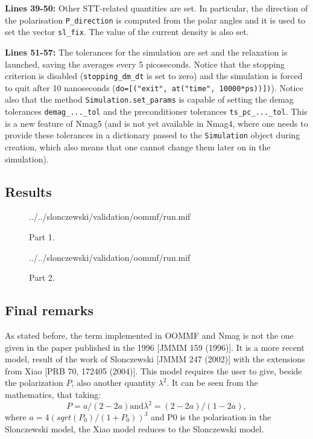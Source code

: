 \documentclass[11pt,oneside,openany]{article}
\begin{document}
\textbf{Lines 39-50:} Other STT-related quantities are set. In particular,
the direction of the polarisation \verb|P_direction| is computed from the
polar angles and it is used to set the vector \verb|sl_fix|.
The value of the current density is also set. 

\textbf{Lines 51-57:} The tolerances for the simulation are set
and the relaxation is launched, saving the averages every 5 picoseconds.
Notice that the stopping criterion is disabled (\verb|stopping_dm_dt| is set
to zero) and the simulation is forced to quit after 10 nanoseconds
(\verb|do=[("exit", at("time", 10000*ps))])|).
Notice also that the method \verb|Simulation.set_params| is capable
of setting the demag tolerances \verb|demag_..._tol| and the preconditioner
tolerances \verb|ts_pc_..._tol|. This is a new feature of Nmag5 (and is
not yet available in Nmag4, where one needs to provide these tolerances
in a dictionary passed to the \verb|Simulation| object during creation,
which also means that one cannot change them later on in the simulation).


%
%
%

\subsection{Results}

\begin{figure}[!p]
  {../../slonczewski/validation/oommf/run.mif}
\caption{Part 1.}
\label{fig:script1of2}
\end{figure}

\begin{figure}[!h]
  {../../slonczewski/validation/oommf/run.mif}
\caption{Part 2.}
\label{fig:script2of2}
\end{figure}

\subsection{Final remarks}
As stated before, the term implemented in OOMMF and Nmag is not the one
given in the paper published in the 1996 [JMMM 159 (1996)]. It is a more
recent model, result of the work of Slonczewski [JMMM 247 (2002)] with the
extensions from Xiao [PRB 70, 172405 (2004)]. This model requires the user
to give, beside the polarization $P$, also another quantity $\lambda^2$.
It can be seen from the mathematics, that taking:
$$
P = a/(2 - 2a) \mathrm{ and } \lambda^2 = (2 - 2a)/(1 - 2a),
$$
where $a = 4 (sqrt(P_0)/(1 + P_0))^3$ and P0 is the polarisation in the
Slonczewski model, the Xiao model reduces to the Slonczewski model.
\end{document}
